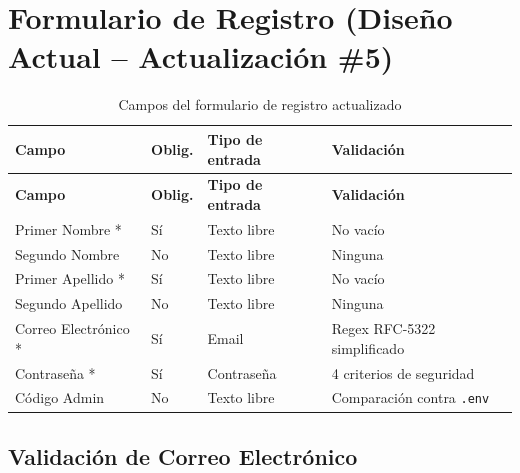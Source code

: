 \documentclass[12pt,a4paper]{article}
\begin{document}
\section{Formulario de Registro (Diseño Actual -- Actualización \#5)}

\begin{longtable}{p{4.5cm} p{2.5cm} p{3cm} p{3.5cm}}
\caption{Campos del formulario de registro actualizado} \label{tab:form-registro-v5} \\
\toprule
\textbf{Campo} & \textbf{Oblig.} & \textbf{Tipo de entrada} & \textbf{Validación} \\
\midrule
\endfirsthead
\toprule
\textbf{Campo} & \textbf{Oblig.} & \textbf{Tipo de entrada} & \textbf{Validación} \\
\midrule
\endhead
\bottomrule
\endlastfoot
Primer Nombre *        & Sí & Texto libre & No vacío \\
Segundo Nombre         & No & Texto libre & Ninguna \\
Primer Apellido *      & Sí & Texto libre & No vacío \\
Segundo Apellido       & No & Texto libre & Ninguna \\
Correo Electrónico *   & Sí & Email       & Regex RFC-5322 simplificado \\
Contraseña *           & Sí & Contraseña  & 4 criterios de seguridad \\
Código Admin           & No & Texto libre & Comparación contra \texttt{.env} \\
\end{longtable}

\subsection{Validación de Correo Electrónico}
\end{document}
